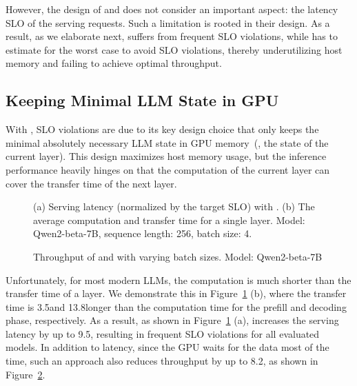 %
However, the design of 
\deepspeed and \flexgen does not consider an important aspect: the latency SLO 
of the serving requests. 
%
Such a limitation is rooted in their design. 
% 
As a result, as we elaborate next, \deepspeed suffers from frequent SLO violations, while \flexgen has to estimate for the worst case to avoid SLO violations, 
thereby underutilizing host memory and failing to achieve optimal throughput. 
%

\subsection{Keeping Minimal LLM State in GPU}
\label{sec:kept}
%
With \deepspeed, SLO violations are due to its key design choice 
that only keeps the minimal absolutely necessary 
LLM state in GPU memory~(\ie, the state of the current layer). 
%
This design maximizes host memory usage, but the inference performance heavily 
hinges on that the computation of the current layer can cover 
the transfer time of the next layer. 
%

\begin{figure}[t]
    \centering
    \vspace{0.6cm}
    \resizebox{\columnwidth}{!}{%
 }
    \caption{(a) Serving latency (normalized by the target SLO) with \deepspeed.  
 (b) The average computation and transfer time for a single layer. 
 Model: Qwen2-beta-7B, sequence length: 256, batch size: 4. 
 }
    \label{fig:moti1}
\end{figure}

\begin{figure}[t]
    \centering
    \resizebox{0.6\columnwidth}{!}{
 }
    \caption{Throughput of \sys and \deepspeed with varying batch sizes. Model: Qwen2-beta-7B}
    \label{fig:moti1c}
\end{figure}


Unfortunately, for most modern LLMs, the computation 
is much shorter than the transfer time of a layer. 
%
We demonstrate this in Figure~\ref{fig:moti1} (b), where the transfer time is 3.5\X and 13.8\X longer than the computation time for the prefill and decoding phase, respectively. 
%
As a result, as shown in Figure~\ref{fig:moti1} (a), \deepspeed increases the
serving latency by up to 9.5\X, resulting in frequent SLO violations for all evaluated models. 
%
In addition to latency, since the GPU waits for the data most of the time, 
such an approach also reduces throughput by up to 8.2\X, as shown in Figure~\ref{fig:moti1c}. 

